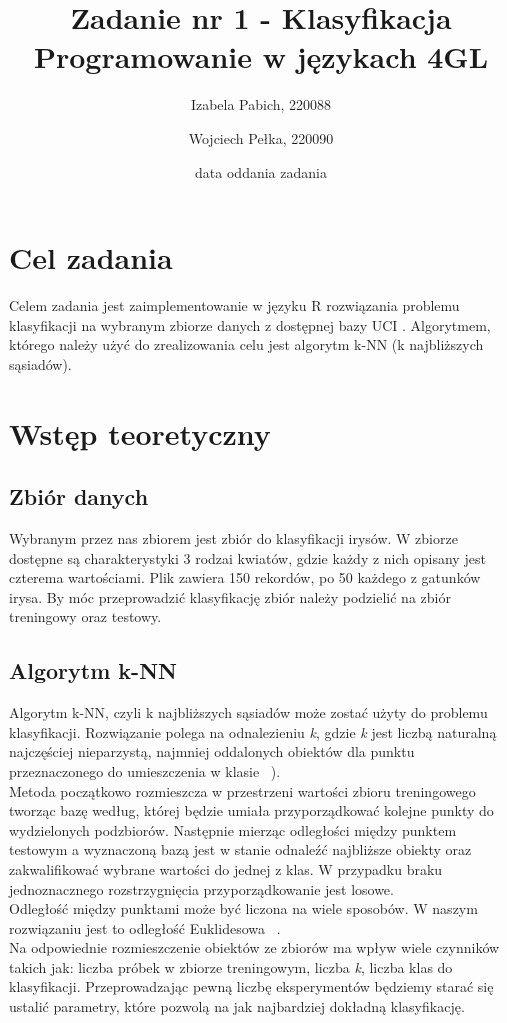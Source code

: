 \documentclass[12pt]{article}
\title{{\bf Zadanie nr 1 - Klasyfikacja}\linebreak
Programowanie w językach 4GL}
\author{Izabela Pabich, 220088 \and Wojciech Pełka, 220090}
\date{data oddania zadania}
\begin{document}
\clearpage\maketitle
\thispagestyle{empty}
\newpage
\setcounter{page}{1}
\section{Cel zadania}

Celem zadania jest zaimplementowanie w języku R rozwiązania problemu klasyfikacji na wybranym zbiorze danych z dostępnej bazy UCI \cite{zbiory}. Algorytmem, którego należy użyć do zrealizowania celu jest algorytm k-NN (k najbliższych sąsiadów). \\

\section{Wstęp teoretyczny}

\subsection{Zbiór danych}
Wybranym przez nas zbiorem jest zbiór do klasyfikacji irysów. W zbiorze dostępne są charakterystyki 3 rodzai kwiatów, gdzie każdy z nich opisany jest czterema wartościami. Plik zawiera 150 rekordów, po 50 każdego z gatunków irysa. By móc przeprowadzić klasyfikację zbiór należy podzielić na zbiór treningowy oraz testowy. \\

\subsection{Algorytm k-NN}
Algorytm k-NN, czyli k najbliższych sąsiadów może zostać użyty do problemu klasyfikacji. Rozwiązanie polega na odnalezieniu \textit{k}, gdzie \textit{k} jest liczbą naturalną najczęściej nieparzystą, najmniej oddalonych obiektów dla punktu przeznaczonego do umieszczenia w klasie ~\cite{knn}). \\
Metoda początkowo rozmieszcza w przestrzeni wartości zbioru treningowego tworząc bazę według, której będzie umiała przyporządkować kolejne punkty do wydzielonych podzbiorów. Następnie mierząc odległości między punktem testowym a wyznaczoną bazą jest w stanie odnaleźć najbliższe obiekty oraz zakwalifikować wybrane wartości do jednej z klas. W przypadku braku jednoznacznego rozstrzygnięcia przyporządkowanie jest losowe. \\
Odległość między punktami może być liczona na wiele sposobów. W naszym rozwiązaniu jest to odległość Euklidesowa ~\cite{euklides}. \\
Na odpowiednie rozmieszczenie obiektów ze zbiorów ma wpływ wiele czynników takich jak: liczba próbek w zbiorze treningowym, liczba \textit{k}, liczba klas do klasyfikacji. Przeprowadzając pewną liczbę eksperymentów będziemy starać się ustalić parametry, które pozwolą na jak najbardziej dokładną klasyfikację.
\end{document}
